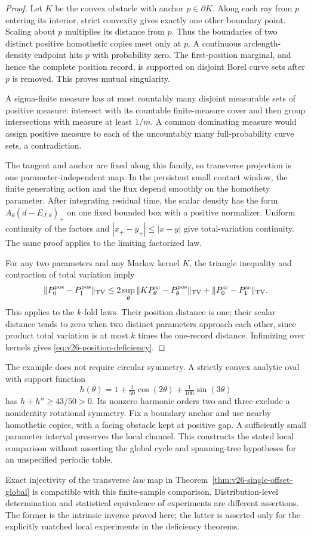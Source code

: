 \begin{proof}
Let \(K\) be the convex obstacle with anchor \(p\in\partial K\).  Along
each ray from \(p\) entering its interior, strict convexity gives exactly
one other boundary point.  Scaling about \(p\) multiplies its distance
from \(p\).  Thus the boundaries of two distinct positive homothetic
copies meet only at \(p\).  A continuous arclength-density endpoint hits
\(p\) with probability zero.  The first-position marginal, and hence the
complete position record, is supported on disjoint Borel curve sets after
\(p\) is removed.  This proves mutual singularity.

A sigma-finite measure has at most countably many disjoint measurable sets
of positive measure: intersect with its countable finite-measure cover and
then group intersections with measure at least \(1/m\).  A common dominating
measure would assign positive measure to each of the uncountably many
full-probability curve sets, a contradiction.

The tangent and anchor are fixed along this family, so transverse projection
is one parameter-independent map.  In the persistent small contact window,
the finite generating action and the flux depend smoothly on the homothety
parameter.  After integrating residual time, the scalar density has the
form \(A_\theta(d-E_{J,\theta})_+\) on one fixed bounded box with a positive
normalizer.  Uniform continuity of the factors and
\(|x_+-y_+|\le|x-y|\) give total-variation continuity.  The same proof
applies to the limiting factorized law.

For any two parameters and any Markov kernel \(K\), the triangle inequality
and contraction of total variation imply
\[
 \|P^{\rm pos}_0-P^{\rm pos}_1\|_{\rm TV}
 \le 2\sup_\theta\|KP^{\rm sc}_\theta-P^{\rm pos}_\theta\|_{\rm TV}
                 +\|P^{\rm sc}_0-P^{\rm sc}_1\|_{\rm TV}.
\]
This applies to the \(k\)-fold laws.  Their position distance is one; their
scalar distance tends to zero when two distinct parameters approach each
other, since product total variation is at most \(k\) times the one-record
distance.  Infimizing over kernels gives
\eqref{eq:v26-position-deficiency}.
\end{proof}

The example does not require circular symmetry.  A strictly convex analytic
oval with support function
\[
 h(\theta)=1+\tfrac1{50}\cos(2\theta)+\tfrac1{100}\sin(3\theta)
\]
has \(h+h''\ge43/50>0\).  Its nonzero harmonic orders two and three
exclude a nonidentity rotational symmetry.  Fix a boundary anchor and use
nearby homothetic copies, with a facing obstacle kept at positive gap.
A sufficiently small parameter interval preserves the local channel.
This constructs the stated local comparison without asserting the global
cycle and spanning-tree hypotheses for an unspecified periodic table.

Exact injectivity of the transverse \emph{law} map in
Theorem~\ref{thm:v26-single-offset-global} is compatible with this finite-sample
comparison.  Distribution-level determination and statistical equivalence
of experiments are different assertions.  The former is the intrinsic inverse
proved here; the latter is asserted only for the explicitly matched local
experiments in the deficiency theorems.
